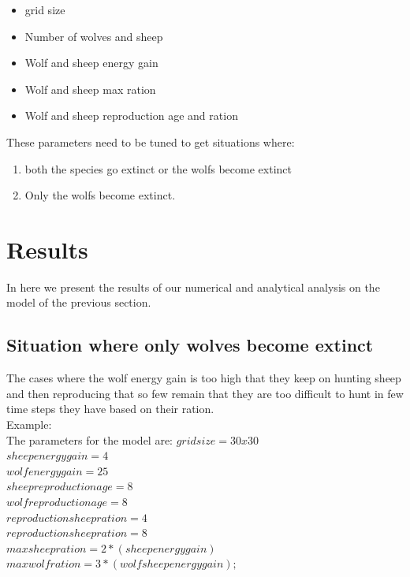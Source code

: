 \documentclass[prl,12pt,citeautoscript,reprint]{revtex4-1}
\begin{document}
  \begin{itemize}
  \item grid size
  \item Number of wolves and sheep
  \item Wolf and sheep energy gain
  \item Wolf and sheep max ration
  \item Wolf and sheep reproduction age and ration 
  \end{itemize}
These parameters need to be tuned to get situations where: 
\begin{enumerate}
\item both the species go extinct or the wolfs become extinct
\item Only the wolfs become extinct. 
\end{enumerate}


\section{Results}
In here we present the results of our numerical and analytical analysis on the model of the previous section. 
\subsection{Situation where only wolves  become extinct}
The cases where the wolf energy gain is too high that they keep on hunting sheep and then reproducing that so few remain that they are too difficult to hunt in few time steps they have based on their ration.
\\Example:\\
The parameters for the model are:\newline
$ grid size = 30x30 $\\
$sheep energy gain = 4$\\
$wolf energy gain = 25$\\
$sheep reproduction age=8$\\
$wolf reproduction age=8$\\
$reproduction sheep ration=4$\\
$reproduction sheep ration=8$\\
$max sheep ration=2*(sheep energy gain)$\\
$max wolf ration=3*(wolf sheep energy gain);$\\
\end{document}
